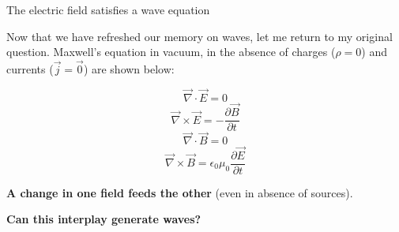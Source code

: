 \begin{frame}{The electric field satisfies a wave equation}

Now that we have refreshed our memory on waves, let me return to my
original question. Maxwell's equation in vacuum, in the absence of
charges ($\rho = 0$) and currents ($\vec{j} = \vec{0}$) are shown below:

     \begin{equation*}
       \vec{\nabla} \cdot \vec{E} = 0
     \end{equation*}
     \begin{equation*}
       \vec{\nabla} \times \vec{E} = - \frac{\partial \vec{B}}{\partial t}
     \end{equation*}
     \begin{equation*}
       \vec{\nabla} \cdot \vec{B} = 0
      \end{equation*}
      \begin{equation*}
        \vec{\nabla} \times \vec{B} = \epsilon_0 \mu_0 \frac{\partial \vec{E}}{\partial t}
      \end{equation*}

\vspace{0.4cm}

{\bf A change in one field feeds the other} (even in absence of sources).\\

\vspace{0.2cm}

{\bf Can this interplay generate waves?}

\end{frame}

%
%
%
%

